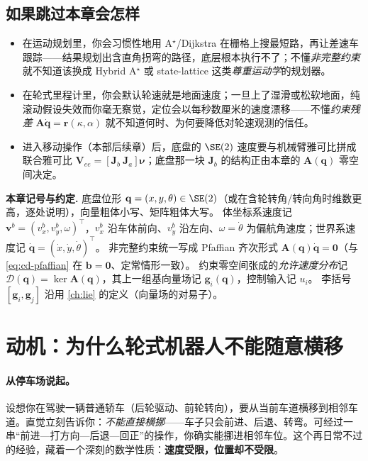 \subsection*{如果跳过本章会怎样}
\begin{itemize}
  \item 在运动规划里，你会习惯性地用 A$^\star$/Dijkstra 在栅格上搜最短路，再让差速车跟踪——结果规划出含直角拐弯的路径，底层根本执行不了；不懂\emph{非完整约束}就不知道该换成 Hybrid A$^\star$ 或 state-lattice 这类\emph{尊重运动学}的规划器。
  \item 在轮式里程计里，你会默认轮速就是地面速度；一旦上了湿滑或松软地面，纯滚动假设失效而你毫无察觉，定位会以每秒数厘米的速度漂移——不懂\emph{约束残差} $\mathbf{A}\dot{\mathbf{q}}=\mathbf{r}(\kappa,\alpha)$ 就不知道何时、为何要降低对轮速观测的信任。
  \item 进入移动操作（本部后续章）后，底盘的 $\SE(2)$ 速度要与机械臂雅可比拼成联合雅可比 $\mathbf{V}_{ee}=[\mathbf{J}_b\ \mathbf{J}_a]\boldsymbol{\nu}$；底盘那一块 $\mathbf{J}_b$ 的结构正由本章的 $\mathbf{A}(\mathbf{q})$ 零空间决定。
\end{itemize}

\begin{note}
\textbf{本章记号与约定.}\;
底盘位形 $\mathbf{q}=(x,y,\theta)\in\SE(2)$（或在含轮转角/转向角时维数更高，逐处说明），向量粗体小写、矩阵粗体大写。
体坐标系速度记 $\mathbf{v}^b=(v_x^b,v_y^b,\omega)^\top$，$v_x^b$ 沿车体前向、$v_y^b$ 沿左向、$\omega=\dot\theta$ 为偏航角速度；世界系速度记 $\dot{\mathbf{q}}=(\dot x,\dot y,\dot\theta)^\top$。
非完整约束统一写成 Pfaffian 齐次形式 $\mathbf{A}(\mathbf{q})\dot{\mathbf{q}}=\mathbf{0}$（与 \cref{eq:cd-pfaffian} 在 $\mathbf{b}=\mathbf{0}$、定常情形一致）。
约束零空间张成的\emph{允许速度分布}记 $\mathcal{D}(\mathbf{q})=\ker\mathbf{A}(\mathbf{q})$，其上一组基向量场记 $\mathbf{g}_i(\mathbf{q})$，控制输入记 $u_i$。
李括号 $[\mathbf{g}_i,\mathbf{g}_j]$ 沿用 \cref{ch:lie} 的定义（向量场的对易子）。
\end{note}

\section{动机：为什么轮式机器人不能随意横移}
\label{sec:mw-motivation}

\paragraph{从停车场说起。}
设想你在驾驶一辆普通轿车（后轮驱动、前轮转向），要从当前车道横移到相邻车道。直觉立刻告诉你：\emph{不能直接横挪}——车子只会前进、后退、转弯。可经过一串“前进—打方向—后退—回正”的操作，你确实能挪进相邻车位。这个再日常不过的经验，藏着一个深刻的数学性质：\textbf{速度受限，位置却不受限}。

